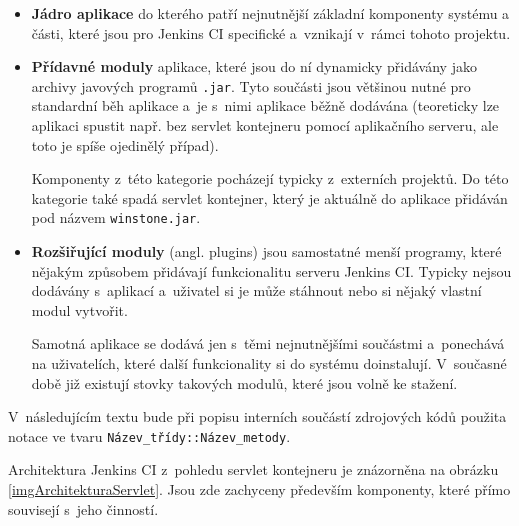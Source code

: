             \begin{itemize}
                \item{\textbf{Jádro aplikace} do kterého patří nejnutnější základní komponenty systému a
                    části, které jsou pro Jenkins CI specifické a~vznikají v~rámci tohoto projektu.}

                \item{\textbf{Přídavné moduly} aplikace, které jsou do ní dynamicky přidávány jako archivy javových programů
                    \texttt{.jar}. Tyto součásti jsou většinou nutné pro standardní běh aplikace a~je s~nimi aplikace
                    běžně dodávána (teoreticky lze
                    aplikaci spustit např. bez servlet kontejneru pomocí aplikačního serveru, ale toto je spíše ojedinělý případ). 
                    
                    Komponenty z~této kategorie pocházejí typicky z~externích projektů.
                    Do této kategorie také spadá servlet kontejner, který je aktuálně do aplikace
                    přidáván pod názvem \texttt{winstone.jar}.}

                \item{\textbf{Rozšiřující moduly} (angl. plugins) jsou samostatné menší programy, které nějakým
                    způsobem přidávají funkcionalitu serveru Jenkins CI. Typicky nejsou dodávány s~aplikací
                    a~uživatel si je může stáhnout nebo si nějaký vlastní modul vytvořit.
                    
                    Samotná aplikace se dodává jen s~těmi nejnutnějšími součástmi a~ponechává na uživatelích, které
                    další funkcionality si do systému doinstalují. V~současné době již existují stovky takových
                    modulů, které jsou volně ke stažení. }
            \end{itemize}
            

            V~následujícím textu bude při popisu interních součástí zdrojových kódů použita notace
            ve tvaru \texttt{Název\_třídy::Název\_metody}.

            Architektura Jenkins CI z~pohledu servlet kontejneru je znázorněna na obrázku \ref{imgArchitekturaServlet}.
            Jsou zde zachyceny především komponenty, které přímo souvisejí s~jeho činností.

